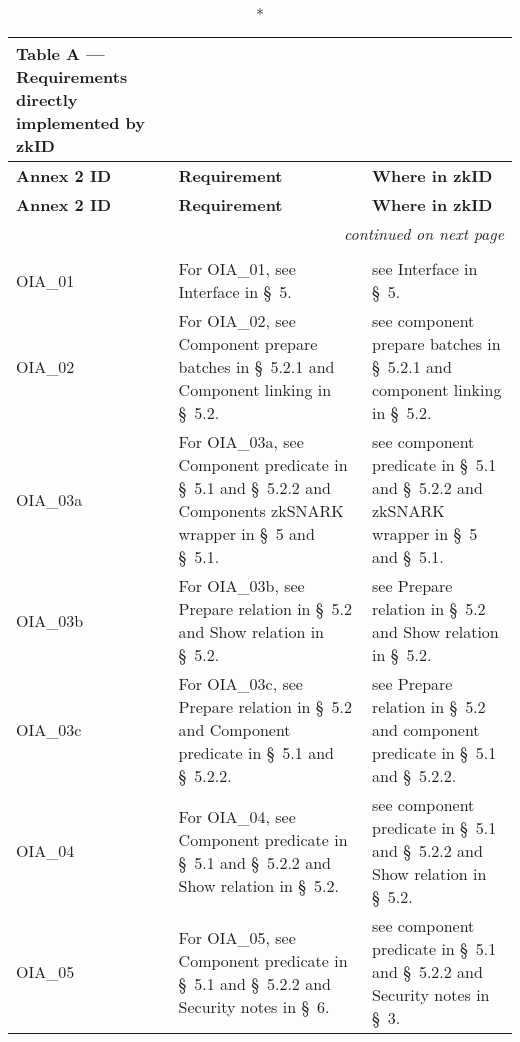 \clearpage
\begin{landscape}
\small
\begin{longtable}{p{3cm} p{10cm} p{7cm}}
\caption*{Table A — Requirements directly implemented by zkID}\\
\toprule
\textbf{Annex 2 ID} &
\textbf{Requirement} &
\textbf{Where in zkID} \\
\midrule
\endfirsthead
\toprule
\textbf{Annex 2 ID} &
\textbf{Requirement} &
\textbf{Where in zkID} \\
\midrule
\endhead
\midrule
\multicolumn{3}{r}{\emph{continued on next page}}\\
\bottomrule
\endfoot
\bottomrule
\endlastfoot

\multicolumn{3}{l}{\textbf{Topic 1 — Online Identification and Authentication (OIA)}}\\

OIA\_01 &
For OIA\_01, see Interface in \S~5. &
see Interface in \S~5. \\

OIA\_02 &
For OIA\_02, see Component prepare batches in \S~5.2.1 and Component linking in \S~5.2. &
see component prepare batches in \S~5.2.1 and component linking in \S~5.2. \\

OIA\_03a &
For OIA\_03a, see Component predicate in \S~5.1 and \S~5.2.2 and Components zkSNARK wrapper in \S~5 and \S~5.1. &
see component predicate in \S~5.1 and \S~5.2.2 and zkSNARK wrapper in \S~5 and \S~5.1. \\

OIA\_03b &
For OIA\_03b, see Prepare relation in \S~5.2 and Show relation in \S~5.2. &
see Prepare relation in \S~5.2 and Show relation in \S~5.2. \\

OIA\_03c &
For OIA\_03c, see Prepare relation in \S~5.2 and Component predicate in \S~5.1 and \S~5.2.2. &
see Prepare relation in \S~5.2 and component predicate in \S~5.1 and \S~5.2.2. \\

OIA\_04 &
For OIA\_04, see Component predicate in \S~5.1 and \S~5.2.2 and Show relation in \S~5.2. &
see component predicate in \S~5.1 and \S~5.2.2 and Show relation in \S~5.2. \\

OIA\_05 &
For OIA\_05, see Component predicate in \S~5.1 and \S~5.2.2 and Security notes in \S~6. &
see component predicate in \S~5.1 and \S~5.2.2 and Security notes in \S~3. \\


\end{longtable}
\end{landscape}
